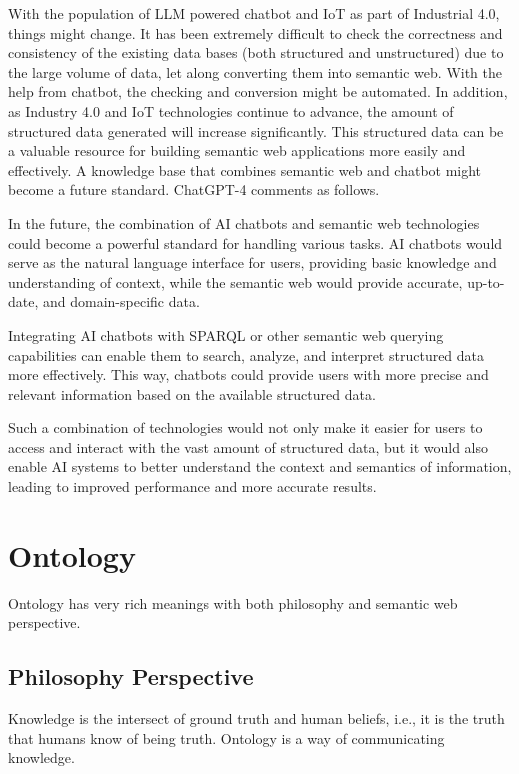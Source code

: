 With the population of LLM powered chatbot and IoT as part of Industrial 4.0, things might change. It has been extremely difficult to check the correctness and consistency of the existing data bases (both structured and unstructured) due to the large volume of data, let along converting them into semantic web. With the help from chatbot, the checking and conversion might be automated. In addition, as Industry 4.0 and IoT technologies continue to advance, the amount of structured data generated will increase significantly. This structured data can be a valuable resource for building semantic web applications more easily and effectively. A knowledge base that combines semantic web and chatbot might become a future standard. ChatGPT-4 comments as follows.

\begin{mdframed}
In the future, the combination of AI chatbots and semantic web technologies could become a powerful standard for handling various tasks. AI chatbots would serve as the natural language interface for users, providing basic knowledge and understanding of context, while the semantic web would provide accurate, up-to-date, and domain-specific data.

Integrating AI chatbots with SPARQL or other semantic web querying capabilities can enable them to search, analyze, and interpret structured data more effectively. This way, chatbots could provide users with more precise and relevant information based on the available structured data.

Such a combination of technologies would not only make it easier for users to access and interact with the vast amount of structured data, but it would also enable AI systems to better understand the context and semantics of information, leading to improved performance and more accurate results.
\end{mdframed}

\section{Ontology}

Ontology has very rich meanings with both philosophy and semantic web perspective.

\subsection{Philosophy Perspective}

Knowledge is the intersect of ground truth and human beliefs, i.e., it is the truth that humans know of being truth. Ontology is a way of communicating knowledge.

